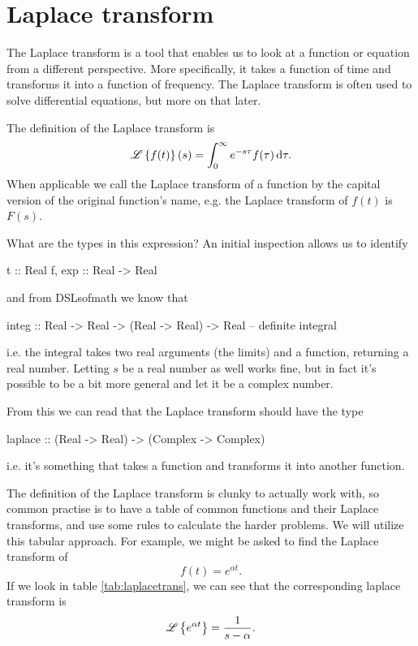 
\section{Laplace transform}
The Laplace transform is a tool that enables us to look at a function or equation from a different perspective. More specifically, it takes a function of time and transforms it into a function of frequency.
The Laplace transform is often used to solve differential equations, but more on that later. 

The definition of the Laplace transform is  
\begin{equation*}
    \Lplc \left\{ f(t)\right\}(s) = \int_0^\infty e^{-s\tau} f(\tau) \, \text{d} \tau. %
\end{equation*}
When applicable we call the Laplace transform of a function by the capital version of the original function's name, e.g. the Laplace transform of $f(t)$ is $F(s)$.

What are the types in this expression? An initial inspection allows us to identify
\begin{code}
t      :: Real 
f, exp :: Real -> Real 
\end{code}
and from DSLsofmath we know that 
\begin{code}
integ :: Real -> Real -> (Real -> Real) -> Real -- definite integral \end{code}%
i.e. the integral takes two real arguments (the limits) and a function, returning a real number. 
Letting $s$ be a real number as well works fine, but in fact it's possible to be a bit more general and let it be a complex number. 

From this we can read that the Laplace transform should have the type
\begin{code}
laplace :: (Real -> Real) -> (Complex -> Complex) 
\end{code}
i.e. it's something that takes a function and transforms it into another function. 

The definition of the Laplace transform is clunky to actually work with, so common practise is to have a table of common functions and their Laplace transforms, and use some rules to calculate the harder problems. 
We will utilize this tabular approach. For example, we might be asked to find the Laplace transform of 
\begin{equation*}
    f(t) = e^{\alpha t}.
\end{equation*}
If we look in table \ref{tab:laplacetrans}, we can see that the corresponding laplace transform is 
\begin{equation*}
    \mathscr{L} \left\{e^{\alpha t}\right\} = \frac{1}{s-\alpha}.
\end{equation*}


